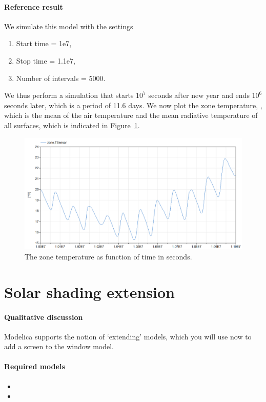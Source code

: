 \documentclass[10pt,a4paper]{article}
\begin{document}
\newpage

\paragraph{Reference result}
We simulate this model with the settings
\begin{enumerate}
\item Start time = 1e7,
\item Stop time = 1.1e7,
\item Number of intervals = 5000.
\end{enumerate}
We thus perform a simulation that starts $10^7$ seconds after new year and ends $10^6$
seconds later, which is a period of 11.6 days.
We now plot the zone temperature, ,
which is the mean of the air temperature and the mean radiative 
temperature of all surfaces, which is indicated in Figure~\ref{fig:res1}.

\begin{figure}[h!]
\centering
\includegraphics[scale=0.65]{Example1.png}
\caption{The zone temperature as function of time in seconds.}
\label{fig:res1}
\end{figure}

\newpage

\section{Solar shading extension}
\paragraph{Qualitative discussion}
Modelica supports the notion of `extending' models, which you will
use now to add a screen to the window model.

\paragraph{Required models}
\begin{itemize}
\item {}
\item {}
\end{itemize}
\end{document}
